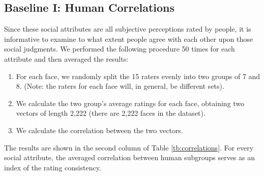 \documentclass[10pt,twocolumn,letterpaper]{article}
\begin{document}
\subsection{Baseline I: Human Correlations} \label{baseline1}
Since these social attributes are all subjective perceptions rated by people, it is informative to examine to what extent people agree with each other upon those social judgments. We performed the following procedure 50 times for each attribute and then averaged the results:
\begin{enumerate}
\item For each face, we randomly split the 15 raters evenly into two groups of 7 and 8. (Note: the raters for each face will, in general, be different sets).
\item We calculate the two group's average ratings for each face, obtaining two vectors of length 2,222 (there are 2,222 faces in the dataset). 
\item We calculate the correlation between the two vectors. 
\end{enumerate}
The results are shown in the second column of Table \ref{tb:correlations}. For every social attribute, the averaged correlation between human subgroups serves as an index of the rating consistency.
\end{document}
